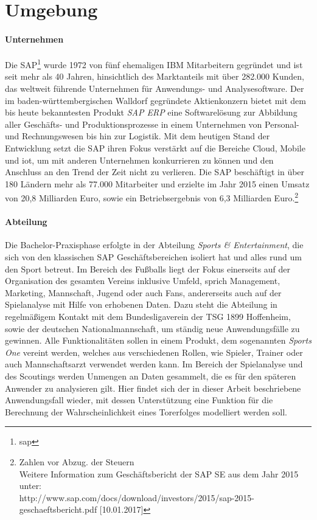 \section{Umgebung}
\paragraph{Unternehmen}
Die SAP\footnote{\gls{sap}} wurde 1972 von fünf ehemaligen IBM Mitarbeitern gegründet und ist seit mehr als 40 Jahren, hinsichtlich des Marktanteils mit über 282.000 Kunden, das weltweit führende Unternehmen für Anwendungs- und Analysesoftware. Der im baden-württembergischen Walldorf gegründete Aktienkonzern bietet mit dem bis heute bekanntesten Produkt \textit{SAP ERP} eine Softwarelösung zur Abbildung aller Geschäfts- und Produktionsprozesse in einem Unternehmen von Personal- und Rechnungswesen bis hin zur Logistik. Mit dem heutigen Stand der Entwicklung setzt die SAP ihren Fokus verstärkt auf die Bereiche Cloud, Mobile und \gls{iot}, um mit anderen Unternehmen konkurrieren zu können und den Anschluss an den Trend der Zeit nicht zu verlieren. Die SAP beschäftigt in über 180 Ländern mehr als 77.000 Mitarbeiter und erzielte im Jahr 2015 einen Umsatz von 20,8 Milliarden Euro, sowie ein Betriebsergebnis von 6,3 Milliarden Euro.\footnote{Zahlen vor Abzug. der Steuern\\ Weitere Information zum Geschäftsbericht der SAP SE aus dem Jahr 2015 unter: \\ http://www.sap.com/docs/download/investors/2015/sap-2015-geschaeftsbericht.pdf [10.01.2017]}

\paragraph{Abteilung}
Die Bachelor-Praxisphase erfolgte in der Abteilung \textit{Sports \& Entertainment}, die sich von den klassischen SAP Geschäftsbereichen isoliert hat und alles rund um den Sport betreut. Im Bereich des Fußballs liegt der Fokus einerseits auf der Organisation des gesamten Vereins inklusive Umfeld, sprich Management, Marketing, Mannschaft, Jugend oder auch Fans, andererseits auch auf der Spielanalyse mit Hilfe von erhobenen Daten. Dazu steht die Abteilung in regelmäßigem Kontakt mit dem Bundesligaverein der TSG 1899 Hoffenheim, sowie der deutschen Nationalmannschaft, um ständig neue Anwendungsfälle zu gewinnen. Alle Funktionalitäten sollen in einem Produkt, dem sogenannten \textit{Sports One} vereint werden, welches aus verschiedenen Rollen, wie Spieler, Trainer oder auch Mannschaftsarzt verwendet werden kann. Im Bereich der Spielanalyse und des Scoutings werden Unmengen an Daten gesammelt, die es für den späteren Anwender zu analysieren gilt. Hier findet sich der in dieser Arbeit beschriebene Anwendungsfall wieder, mit dessen Unterstützung eine Funktion für die Berechnung der Wahrscheinlichkeit eines Torerfolges modelliert werden soll.